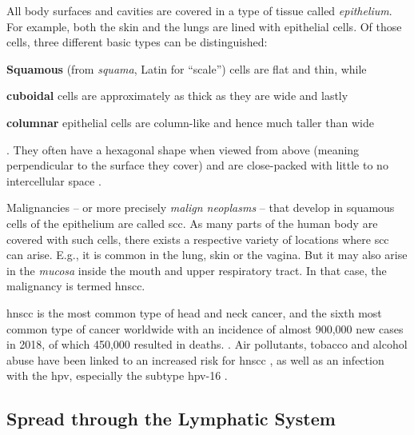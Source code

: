 \documentclass[\relativeRoot/main.tex]{subfiles}
\begin{document}
All body surfaces and cavities are covered in a type of tissue called \emph{epithelium}. For example, both the skin and the lungs are lined with epithelial cells. Of those cells, three different basic types can be distinguished:
\begin{enumerate*}[label={(\arabic*)}]
    \item \textbf{Squamous} (from \emph{squama}, Latin for ``scale'') cells are flat and thin, while 
    \item \textbf{cuboidal} cells are approximately as thick as they are wide and lastly
    \item \textbf{columnar} epithelial cells are column-like and hence much taller than wide
\end{enumerate*}.
They often have a hexagonal shape when viewed from above (meaning perpendicular to the surface they cover) and are close-packed with little to no intercellular space \cite{marieb_human_1995}.

Malignancies -- or more precisely \emph{malign neoplasms} -- that develop in squamous cells of the epithelium are called \gls{scc}. As many parts of the human body are covered with such cells, there exists a respective variety of locations where \gls{scc} can arise. E.g., it is common in the lung, skin or the vagina. But it may also arise in the \emph{mucosa} inside the mouth and upper respiratory tract. In that case, the malignancy is termed \gls{hnscc}.

\gls{hnscc} is the most common type of head and neck cancer, and the sixth most common type of cancer worldwide with an incidence of almost 900,000 new cases in 2018, of which 450,000 resulted in deaths. \cite{johnson_head_2020,ferlay_estimating_2019,bray_global_2018}. Air pollutants, tobacco and alcohol abuse have been linked to an increased risk for \gls{hnscc} \cite{johnson_head_2020,wong_cancers_2014}, as well as an infection with the \gls{hpv}, especially the subtype \gls{hpv}-16 \cite{hennessey_human_2009}.

\subsection*{Spread through the Lymphatic System}
\label{subsec:intro:hnscc:lymph_spread}
\end{document}
